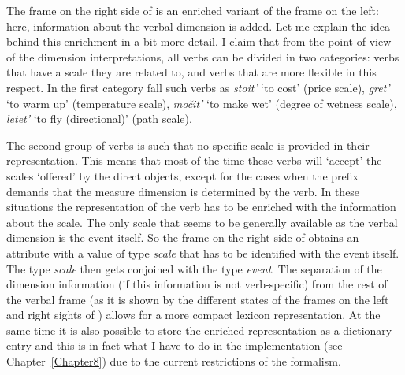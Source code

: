 The frame on the right side of  is an enriched variant of the frame on the left: here, information about the verbal dimension is added. Let me explain the idea behind this enrichment in a bit more detail. I claim that from the point of view of the dimension interpretations, all verbs can be divided in two categories: verbs that have a scale they are related to, and verbs that are more flexible in this respect. In the first category fall such verbs as \textit{stoit'} `to cost' (price scale), \textit{gret'} `to warm up' (temperature scale), \textit{mo\v{c}it'} `to make wet' (degree of wetness scale), \textit{letet'} `to fly (directional)' (path scale). 


The second group of verbs is such that no specific scale is provided in their representation. This means that most of the time these verbs will `accept' the scales `offered' by the direct objects, except for the cases when the prefix demands that the measure dimension is determined by the verb. In these situations the representation of the verb has to be enriched with the information about the scale. The only scale that seems to be generally available as the verbal dimension is the event itself. So the frame on the right side of  obtains an attribute \VERBDIM with a value of type \textit{scale} that has to be identified with the event itself. The type \textit{scale} then gets conjoined with the type \textit{event}. The separation of the dimension information (if this information is not verb-specific) from the rest of the verbal frame (as it is shown by the different states of the frames on the left and right sights of ) allows for a more compact lexicon representation. At the same time it is also possible to store the enriched representation as a dictionary entry and this is in fact what I have to do in the implementation (see Chapter~\ref{Chapter8}) due to the current restrictions of the formalism. 
 
